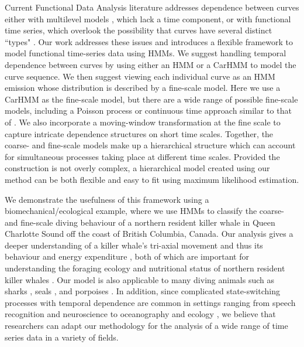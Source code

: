 

Current Functional Data Analysis literature addresses dependence between curves either with multilevel models \citep{Chen:2012,Di:2009}, which lack a time component, or with functional time series, which overlook the possibility that curves have several distinct ``types" \citep{Kokoszka:2018}. Our work addresses these issues and introduces a flexible framework to model functional time-series data using HMMs.
We suggest handling temporal dependence between curves by using either an HMM or a CarHMM to model the curve sequence. We then suggest viewing each individual curve as an HMM emission whose distribution is described by a fine-scale model. Here we use a CarHMM as the fine-scale model, but there are a wide range of possible fine-scale models, including a Poisson process or continuous time approach similar to that of \citet{Michelot:2019}. We also incorporate a moving-window transformation at the fine scale to capture intricate dependence structures on short time scales. Together, the coarse- and fine-scale models make up a hierarchical structure which can account for simultaneous processes taking place at different time scales. Provided the construction is not overly complex, a hierarchical model created using our method can be both flexible and easy to fit using maximum likelihood estimation.

We demonstrate the usefulness of this framework using a biomechanical/ecological example, where we use HMMs to classify the coarse- and fine-scale diving behaviour of a northern resident killer whale in Queen Charlotte Sound off the coast of British Columbia, Canada. Our analysis gives a deeper understanding of a killer whale's tri-axial movement and thus its behaviour and energy expenditure \citep{Gleiss:2011,Qasem:2012}, both of which are important for understanding the foraging ecology and nutritional status of northern resident killer whales \citep{Noren:2011}. Our model is also applicable to many diving animals such as sharks \citep{Adam:2019}, seals \citep{Dot:2016}, and porpoises \citep{Barajas:2017}. In addition, since complicated state-switching processes with temporal dependence are common in settings ranging from speech recognition \citep{Juang:1991} and neuroscience \citep{Langrock:2013} to oceanography \citep{Bulla:2012} and ecology \citep{Adam:2019}, we believe that researchers can adapt our methodology for the analysis of a wide range of time series data in a variety of fields.

